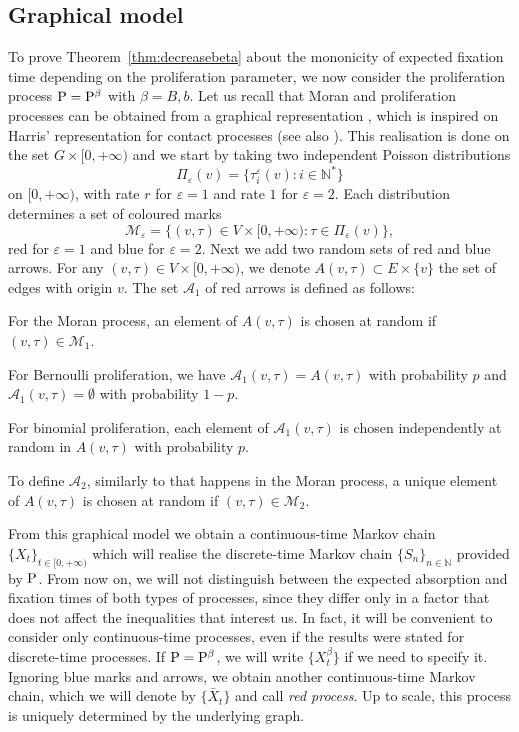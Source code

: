 \documentclass[a4paper,english,10pt]{amsart}
\newcommand{\N}{\mathbb{N}}
\newcommand{\calm}{\mathcal{M}}
\newcommand{\cala}{\mathcal{A}}
\newcommand{\Proc}{\rm P}
\theoremstyle{definition}
\numberwithin{equation}{section}
\begin{document}
\subsection{Graphical model} 
To prove Theorem~\ref{thm:decreasebeta} about the mononicity of expected fixation time depending on the proliferation parameter, we now consider the proliferation process $\Proc = \Proc^\beta$ with $\beta = B,b$. Let us recall that Moran and proliferation processes can be obtained from a graphical representation  \cite{AlcaldeGuerberoffLozano2022}, which is inspired on Harris'  representation for contact processes \cite{Harris} (see also \cite{Griffeath}). This realisation is done on the set $G \times [0,+\infty)$ and we start by taking two independent Poisson distributions 
$$
\Pi_\varepsilon(v) = \{ \tau^\varepsilon_i(v) : i \in \N^\ast\}
$$
on $[0,+\infty)$, with rate $r$ for $\varepsilon = 1$ and rate $1$ for $\varepsilon = 2$. Each distribution determines a set of coloured marks
$$
\calm_\varepsilon = \{ (v,\tau) \in V \times [0,+\infty) : \tau \in \Pi_\varepsilon(v)\}, 
$$
red for $\varepsilon = 1$ and blue for $\varepsilon = 2$. Next we add two random sets of red and blue arrows. For any $(v,\tau) \in V \times [0,+\infty)$, we denote $A(v,\tau) \subset E \times \{v\}$ the set of edges with origin $v$. The set $\cala_1$ of red arrows is defined as follows: 
\begin{list}{\itemii}{\leftmargin=14pt}

\item[1)] For the Moran process, an element of $A(v,\tau)$ is chosen at random if $(v,\tau) \in \calm_1$. 

\item[2)] For Bernoulli proliferation, we have $\cala_1(v,\tau) = A(v,\tau)$ with probability $p$ and $\cala_1(v,\tau) = \emptyset$ with probability $1-p$.

\item[3)] For binomial proliferation, each element of $\cala_1(v,\tau)$ is chosen independently at random in $A(v,\tau)$ with probability $p$. 
\end{list}

\noindent
To define $\cala_2$, similarly to that happens in the Moran process, a unique element of $A(v,\tau)$ is chosen at random if $(v,\tau) \in \calm_2$. 

From this graphical model we obtain a continuous-time Markov chain $\{X_t\}_{t \in [0,+\infty)}$ which will realise the discrete-time Markov chain $\{S_n\}_{n \in \N}$ provided by $\Proc$. 
From now on, we will not distinguish between the expected absorption and fixation times of both types of processes, since they differ only in a factor that does not affect the inequalities that interest us. In fact, it will be convenient to consider only continuous-time processes, even if the results were stated for discrete-time processes. If $\Proc = \Proc^\beta$, we will write $\{X_t^\beta\}$ if we need to specify it.
Ignoring blue marks and arrows, we obtain another continuous-time Markov chain, which we will denote by $\{\bar X_t\}$ and call \emph{red process}. Up to scale, this process is uniquely determined by the underlying graph.
 
\end{document}
